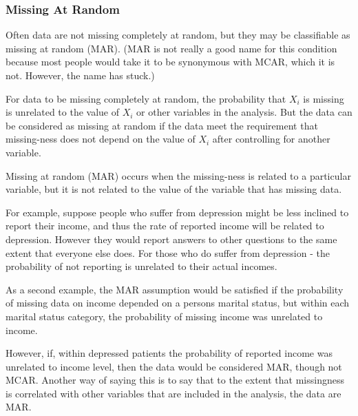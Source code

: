 \documentclass[12pt]{article} %
\begin{document}
\subsubsection{Missing At Random}
Often data are not missing completely at random, but they may be classifiable as missing at random (MAR). (MAR is not really a good name for this condition because most people would take it to be synonymous with MCAR, which it is not. However, the name has stuck.)

For data to be missing completely at random, the probability that $X_i$ is missing is unrelated to the value of  $X_i$ or other variables in the analysis. But the data can be considered as missing at random if the data meet the requirement that missing-ness does not depend on the value of $X_i$ after controlling for another variable.



Missing at random (MAR) occurs when the missing-ness is related to a particular variable, but it is not related to the value of the variable that has missing data.

For example, suppose people who suffer from depression might be less inclined to report their income, and thus the rate of reported income will be related to depression. However they would report answers to other questions to the same extent that everyone else does. For those who do suffer from depression - the probability of not reporting is unrelated to their actual incomes.

As a second example, the MAR assumption would be satisfied if the probability of missing data on income depended on a persons marital status, but within each marital status category, the probability of missing income was unrelated to
income.




However, if, within depressed patients the probability of reported income was unrelated to income level, then the data would be considered MAR, though not MCAR. Another way of saying this is to say that to the extent that missingness is correlated with other variables that are included in the analysis, the data are MAR.
\end{document}
